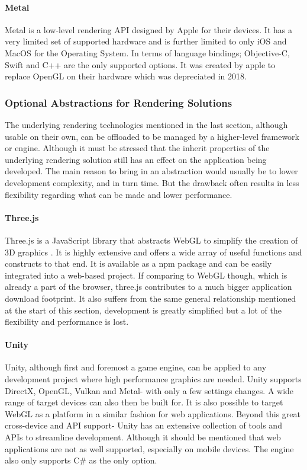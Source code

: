 \paragraph{Metal}
Metal is a low-level rendering API designed by Apple for their devices. It has a very limited set of supported hardware and is further limited to only iOS and MacOS for the Operating System. In terms of language bindings; Objective-C, Swift and C++ are the only supported options. \cite[]{apple_metal} It was created by apple to replace OpenGL on their hardware which was depreciated in 2018.

\subsubsection{Optional Abstractions for Rendering Solutions}
The underlying rendering technologies mentioned in the last section, although usable on their own, can be offloaded to be managed by a higher-level framework or engine. Although it must be stressed that the inherit properties of the underlying rendering solution still has an effect on the application being developed.
The main reason to bring in an abstraction would usually be to lower development complexity, and in turn time. But the drawback often results in less flexibility regarding what can be made and lower performance.

\paragraph{Three.js}
Three.js is a JavaScript library that abstracts WebGL to simplify the creation of 3D graphics \cite[]{mrdoob_threejs}. It is highly extensive and offers a wide array of useful functions and constructs to that end. It is available as a npm package \cite[]{threejsorg_threejs} and can be easily integrated into a web-based project. If comparing to WebGL though, which is already a part of the browser, three.js contributes to a much bigger application download footprint. It also suffers from the same general relationship mentioned at the start of this section, development is greatly simplified but a lot of the flexibility and performance is lost.

\paragraph{Unity}
Unity, although first and foremost a game engine, can be applied to any development project where high performance graphics are needed. Unity supports DirectX, OpenGL, Vulkan and Metal- with only a few settings changes. A wide range of target devices can also then be built for. It is also possible to target WebGL as a platform in a similar fashion for web applications. Beyond this great cross-device and API support- Unity has an extensive collection of tools and APIs to streamline development. Although it should be mentioned that web applications are not as well supported, especially on mobile devices. The engine also only supports C\# as the only option. \cite[]{Nicoll2019} \cite[]{unitytechnologies_unity}

